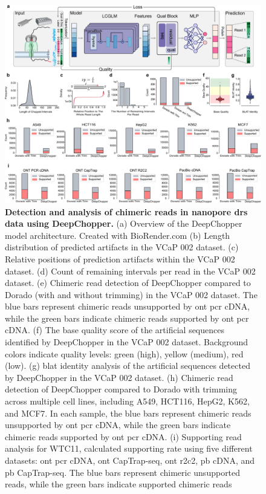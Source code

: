 \documentclass[pdflatex, sn-mathphys-num, lineno]{sn-jnl}%
\theoremstyle{thmstyleone}%
\theoremstyle{thmstyletwo}%
\theoremstyle{thmstylethree}%
\begin{document}
\begin{figure}[!h]
	\includegraphics[height=0.78\columnwidth]{finals/figure1}
	\caption{{\bf  Detection and analysis of chimeric reads in nanopore \gls{drs} data using DeepChopper.} (a) Overview of the DeepChopper model architecture. Created with BioRender.com (b) Length distribution of predicted artifacts in the VCaP 002 dataset. (c)  Relative positions of prediction artifacts within the VCaP 002 dataset. (d) Count of remaining intervals per read in the VCaP 002 dataset. (e) Chimeric read detection of DeepChopper compared to Dorado (with and without trimming) in the VCaP 002 dataset. The blue bars represent chimeric reads unsupported by \gls{ont} \gls{pcr} cDNA, while the green bars indicate chimeric reads supported by \gls{ont} \gls{pcr} cDNA.  (f) The base quality score of the artificial sequences identified by DeepChopper in the VCaP 002 dataset. Background colors indicate quality levels: green (high), yellow (medium), red (low). (g) \gls{blat} identity analysis of the artificial sequences detected by DeepChopper in the VCaP 002 dataset. (h) Chimeric read detection of DeepChopper compared to Dorado with trimming across multiple cell lines, including A549, HCT116, HepG2, K562, and MCF7. In each sample, the blue bars represent chimeric reads unsupported by \gls{ont} \gls{pcr} cDNA, while the green bars indicate chimeric reads supported by \gls{ont} \gls{pcr} cDNA. (i)  Supporting read analysis for WTC11, calculated supporting rate using five different datasets: \gls{ont} \gls{pcr} cDNA, \gls{ont} CapTrap-seq, \gls{ont} \gls{r2c2}, \gls{pb} cDNA, and \gls{pb} CapTrap-seq. The blue bars represent chimeric unsupported reads, while the green bars indicate supported chimeric reads}\label{fig:f1}
\end{figure}
\end{document}
